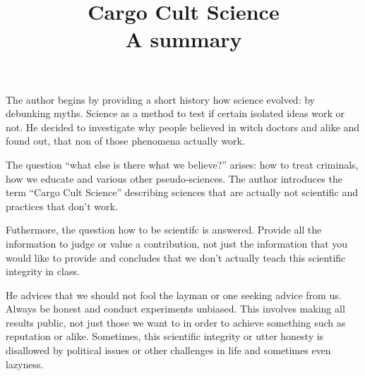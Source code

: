 \documentclass[a4paper,12pt,english]{scrartcl}
\title{Cargo Cult Science \\ {\large A summary}}
\begin{document}
\maketitle

\thispagestyle{empty}
\pagestyle{empty}

The author begins by providing a short history how science evolved: by
debunking myths. Science as a method to test if certain isolated ideas work or
not. He decided to investigate why people believed in witch doctors and alike
and found out, that non of those phenomena actually work.

The question \enquote{what else is there what we believe?} arises: how to
treat criminals, how we educate and various other pseudo-sciences. The author
introduces the term \enquote{Cargo Cult Science} describing sciences that are
actually not scientific and practices that don't work.

Futhermore, the question how to be scientifc is answered. Provide all the
information to judge or value a contribution, not just the information
that you would like to provide and concludes that we don't actually teach this
scientific integrity in class.

He advices that we should not fool the layman or one seeking advice from us.
Always be honest and conduct experiments unbiased. This involves making all
results public, not just those we want to in order to achieve something such
as reputation or alike.
Sometimes, this scientific integrity or utter honesty is disallowed by
political issues or other challenges in life and sometimes even lazyness.
\end{document}
